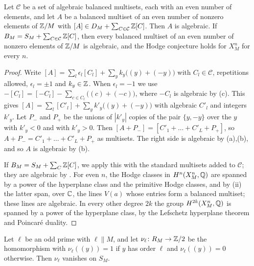 \begin{lemma}\label{lem:transfer}
Let $\mathcal C$ be a set of algebraic balanced multisets, each with an even
number of elements, and let $A$ be a balanced multiset of an even number of
nonzero elements of $\mathbb{Z}/M$ with $[A]\in D_{M}+\sum_{C\in\mathcal C}\mathbb{Z}[C]$.
Then $A$ is algebraic. If $B_{M}=S_{M}+\sum_{C\in\mathcal C}\mathbb{Z}[C]$, then
every balanced multiset of an even number of nonzero elements of $\mathbb{Z}/M$ is
algebraic, and the Hodge conjecture holds for $X^{n}_{M}$ for every $n$.
\end{lemma}

\begin{proof}
Write $[A]=\sum_{l}\epsilon_{l}[C_{l}]+\sum_{y}k_{y}\bigl((y)+(-y)\bigr)$
with $C_{l}\in\mathcal C$, repetitions allowed, $\epsilon_{l}=\pm1$ and
$k_{y}\in\mathbb{Z}$. When $\epsilon_{l}=-1$ we use
$-[C_{l}]=[-C_{l}]-\sum_{c\in C_{l}}\bigl((c)+(-c)\bigr)$, where $-C_{l}$
is algebraic by (c). This gives
$[A]=\sum_{l}[C'_{l}]+\sum_{y}k'_{y}\bigl((y)+(-y)\bigr)$ with algebraic
$C'_{l}$ and integers $k'_{y}$. Let $P_{-}$ and $P_{+}$ be the unions of
$|k'_{y}|$ copies of the pair $\{y,-y\}$ over the $y$ with $k'_{y}<0$ and
with $k'_{y}>0$. Then $[A+P_{-}]=[C'_{1}+\dots+C'_{L}+P_{+}]$, so
$A+P_{-}=C'_{1}+\dots+C'_{L}+P_{+}$ as multisets. The right side is
algebraic by (a),(b), and so $A$ is algebraic by
(b).

If $B_{M}=S_{M}+\sum_{C}\mathbb{Z}[C]$, we apply this with the standard multisets
added to $\mathcal C$; they are algebraic by . For
even $n$, the Hodge classes in $H^{n}(X^{n}_{M},\mathbb{Q})$ are spanned by a power
of the hyperplane class and the primitive Hodge classes, and by
(ii) the latter span, over $\mathbb{C}$, the lines $V(a)$
whose entries form a balanced multiset; these lines are algebraic. In every
other degree $2k$ the group $H^{2k}(X^{n}_{M},\mathbb{Q})$ is spanned by a power of
the hyperplane class, by the Lefschetz hyperplane theorem and Poincar\'e
duality.
\end{proof}

\begin{lemma}\label{lem:nu}
Let $\ell$ be an odd prime with $\ell\parallel M$, and let $\nu_{\ell}\colon
R_{M}\to\mathbb{Z}/2$ be the homomorphism with $\nu_{\ell}((y))=1$ if $y$ has order
$\ell$ and $\nu_{\ell}((y))=0$ otherwise. Then $\nu_{\ell}$ vanishes on
$S_{M}$.
\end{lemma}

